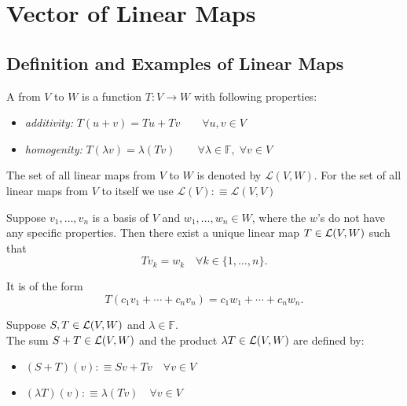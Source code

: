 \section{Vector of Linear Maps}

\subsection{Definition and Examples of Linear Maps}

\begin{mydef} 
  A \lm from $V$ to $W$ is a function $T:V\to W$ with following properties:
  \begin{itemize}
    \item \emph{additivity:} $T(u+v)=Tu + Tv \qquad \forall u,v \in V$
    \item \emph{homogenity:} $T(\lambda v)=\lambda (Tv) \qquad
    \forall \lambda \in \mathbb{F}, \; \forall v\in V$
  \end{itemize}
\end{mydef}

\begin{mydef} 
  The set of all linear maps from $V$ to $W$ is denoted by $\mathcal{L}(V,W)$. For the set of all linear maps from $V$ to itself we use $\mathcal{L}(V) :\equiv \mathcal{L}(V,V)$
\end{mydef}

\setcounter{thm}{3}
\begin{thm}
  \label{thm: linear map lemma}
  Suppose $v_1, \dots, v_n$ is a basis of $V$ and $w_1, \dots, w_n \in W$, where the $w$'s do not have any specific properties. Then there exist a unique linear map $T \in \mathcal{L}(V,W)$ such that
  \begin{equation}
    Tv_{k} = w_k \quad \forall k \in \{1, \dots, n\}.
  \end{equation}

  It is of the form \begin{equation}
    T(c_1 v_1 + \cdots + c_n v_n) = c_1 w_1 + \cdots + c_n w_n.
  \end{equation}
\end{thm}

\setcounter{thm}{4}
\begin{mydef} 
  Suppose $S, T \in {\mathcal{L}(V,W)}$ and $\lambda \in \mathbb{F}.$ \\
  The sum $S+T \in \mathcal{L} (V,W)$ and the product $\lambda T \in \mathcal{L} (V,W)$ are defined by:
  \begin{itemize}
    \item $(S+T)(v) :\equiv Sv+Tv \quad \forall v \in V$
    \item $(\lambda T)(v) : \equiv \lambda (Tv) \quad \forall v \in V$
  \end{itemize}
\end{mydef}

